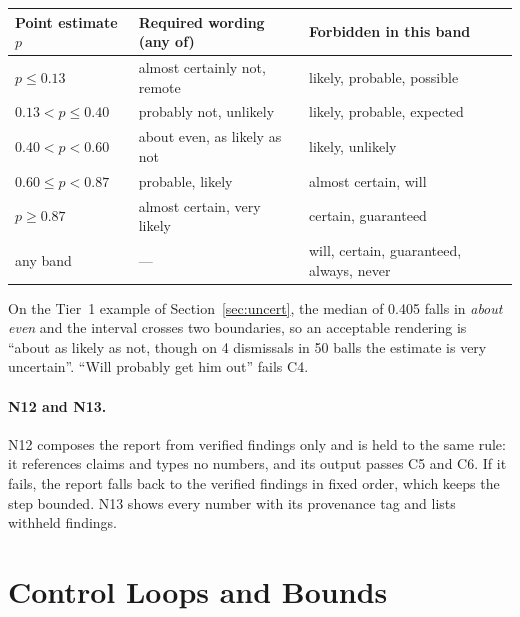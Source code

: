 \documentclass[11pt,a4paper]{article}
\begin{document}
\begin{center}
\footnotesize
\renewcommand{\arraystretch}{1.2}
\begin{tabular}{@{}>{\raggedright\arraybackslash}p{3.2cm}
                  >{\raggedright\arraybackslash}p{5.4cm}
                  >{\raggedright\arraybackslash}p{5.6cm}@{}}
\toprule
\textbf{Point estimate $p$} & \textbf{Required wording (any of)} & \textbf{Forbidden in this band} \\
\midrule
$p \leq 0.13$ & almost certainly not, remote & likely, probable, possible \\
$0.13 < p \leq 0.40$ & probably not, unlikely & likely, probable, expected \\
$0.40 < p < 0.60$ & about even, as likely as not & likely, unlikely \\
$0.60 \leq p < 0.87$ & probable, likely & almost certain, will \\
$p \geq 0.87$ & almost certain, very likely & certain, guaranteed \\
any band & --- & will, certain, guaranteed, always, never \\
\bottomrule
\end{tabular}
\label{tab:lexicon}
\end{center}

\noindent On the Tier~1 example of Section~\ref{sec:uncert}, the median of 0.405
falls in \emph{about even} and the interval crosses two boundaries, so an
acceptable rendering is ``about as likely as not, though on 4 dismissals in 50
balls the estimate is very uncertain''. ``Will probably get him out'' fails C4.

\paragraph{N12 and N13.} N12 composes the report from verified findings only and
is held to the same rule: it references claims and types no numbers, and its
output passes C5 and C6. If it fails, the report falls back to the verified
findings in fixed order, which keeps the step bounded. N13 shows every number
with its provenance tag and lists withheld findings.

\section{Control Loops and Bounds}
\end{document}
